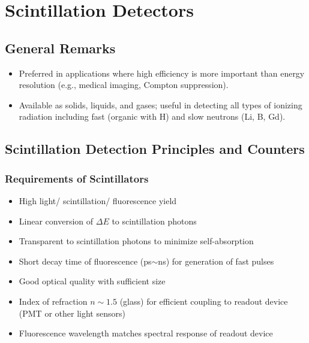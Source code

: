 \section{Scintillation Detectors}
\subsection{General Remarks}
\begin{itemize}
    \item Preferred in applications where high efficiency is more important than energy resolution (e.g., medical imaging, Compton suppression).
    \item Available as solids, liquids, and gases; useful in detecting all types of ionizing radiation including fast (organic with H) and slow neutrons (Li, B, Gd). 
\end{itemize}

\subsection{Scintillation Detection Principles and Counters}
\subsubsection{Requirements of Scintillators}
\begin{itemize}
    \item High light/ scintillation/ fluorescence yield
    \item Linear conversion of $\Delta E$ to scintillation photons
    \item Transparent to scintillation photons to minimize self-absorption
    \item Short decay time of fluorescence (ps$\sim$ns) for generation of fast pulses
    \item Good optical quality with sufficient size
    \item Index of refraction $n\sim1.5$ (glass) for efficient coupling to readout device (PMT or other light sensors)
    \item Fluorescence wavelength matches spectral response of readout device
\end{itemize}

